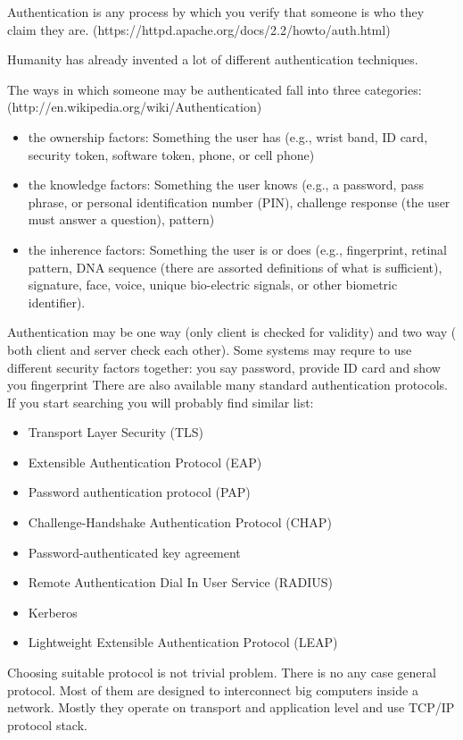 Authentication is any process by which you verify that someone is who they claim
they are. (https://httpd.apache.org/docs/2.2/howto/auth.html)

Humanity has already invented a lot of different authentication techniques. 

The ways in which someone may be authenticated fall into three
categories: (http://en.wikipedia.org/wiki/Authentication)
\begin{itemize}
  \item the ownership factors: Something the user has (e.g., wrist band, ID
  card, security token, software token, phone, or cell phone)
  \item the knowledge factors: Something the user knows (e.g., a password, pass
  phrase, or personal identification number (PIN), challenge response (the user must answer a question), pattern)
  \item the inherence factors: Something the user is or does (e.g., fingerprint,
  retinal pattern, DNA sequence (there are assorted definitions of what is sufficient), signature, face, voice, unique bio-electric signals, or other biometric identifier).
\end{itemize}

Authentication may be one way (only client is checked for validity) and two way
( both client and server check each other). Some systems  may requre to use
different security factors together: you say password, provide ID card and show
you fingerprint There are also available many standard authentication protocols.
If you start searching you will probably find similar list:
\begin{itemize}
  \item Transport Layer Security (TLS)
  \item Extensible Authentication Protocol (EAP)
  \item Password authentication protocol (PAP)
  \item Challenge-Handshake Authentication Protocol (CHAP)
  \item Password-authenticated key agreement
  \item Remote Authentication Dial In User Service (RADIUS)
  \item Kerberos
  \item Lightweight Extensible Authentication Protocol (LEAP)  
\end{itemize}

Choosing suitable protocol is not trivial problem. There is no any case general
protocol.  Most of them are designed to interconnect big computers inside a
network. Mostly they operate on transport and application level and use TCP/IP
protocol stack.

